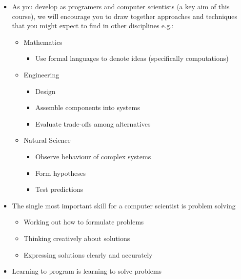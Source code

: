 \documentclass{beamer}
\begin{document}
\begin{frame}
\begin{itemize}
\item As you develop as programers and computer scientists (a key aim of this course), we will encourage you to draw together approaches and techniques that you might expect to find in other disciplines e.g.:  
\begin{itemize}
\item Mathematics 
\begin{itemize}
\item Use formal languages to denote ideas (specifically computations) 
\end{itemize}
\item Engineering
\begin{itemize}
\item Design
\item Assemble components into systems 
\item Evaluate trade-offs among alternatives 
\end{itemize}
\item Natural Science
\begin{itemize}
\item Observe behaviour of complex systems 
\item Form hypotheses
\item Test predictions 
\end{itemize}
\end{itemize}
\end{itemize}	
\end{frame}


\begin{frame}
\begin{itemize}
\item The single most important skill for a computer scientist is \textcolor[rgb]{0.26666668,0.0,0.5176471}{problem solving }
\begin{itemize}
\item Working out how to formulate problems 
\item Thinking creatively about solutions 
\item Expressing solutions clearly and accurately 
\end{itemize}
\item Learning to program is learning to solve problems
\end{itemize}
\end{frame}
\end{document}
